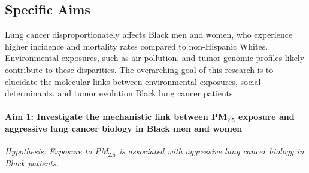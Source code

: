 \newcommand{\SpecificAimOne}{Investigate the mechanistic link between PM$_{2.5}$ exposure and aggressive lung cancer biology in Black men and women}
\newcommand{\SpecificAimOneA}{Determine the association between PM$_{2.5}$ exposure and TP53 somatic mutations in a cohort of 505 lung cancer patients}
\newcommand{\SpecificAimOneB}{Assess the relationship between adverse social determinants of health and PM$_{2.5}$ exposure}
\newcommand{\SpecificAimOneC}{Validate the association between PM$_{2.5}$ and aggressive lung cancer biology using an independent cohort}
\newcommand{\SpecificAimOneD}{Integrate PM$_{2.5}$ exposure data with tumor genomic profiles to identify specific mutational signatures associated with air pollution exposure}

\newcommand{\SpecificAimTwo}{Characterize the timing and order of somatic mutations during lung cancer evolution}
\newcommand{\SpecificAimTwoA}{Reconstruct tumor phylogenetic trees to infer the timing of driver mutations and copy number alterations}
\newcommand{\SpecificAimTwoB}{Identify common patterns in the order of genomic events across lung cancer subtypes}
\newcommand{\SpecificAimTwoC}{Determine whether the timing of mutations differs between Black and White patients}

\newcommand{\SpecificAimThree}{Map cell-cell signaling networks in the lung tumor microenvironment}
\newcommand{\SpecificAimThreeA}{Reconstruct ligand-receptor interactions between malignant, immune, stromal and endothelial cells using single-cell RNA sequencing}
\newcommand{\SpecificAimThreeB}{Identify key signaling pathways and cell-cell interactions associated with early lung cancer development}
\newcommand{\SpecificAimThreeC}{Determine how the tumor microenvironment signaling network differs between Black and White patients}

\subsection{Specific Aims}

Lung cancer disproportionately affects Black men and women, who experience higher incidence and mortality rates compared to non-Hispanic Whites. 
Environmental exposures, such as air pollution, and tumor genomic profiles likely contribute to these disparities. 
The overarching goal of this research is to elucidate the molecular links between environmental exposures, social determinants, 
and tumor evolution Black lung cancer patients.

\paragraph*{Aim 1: \SpecificAimOne} \emph{Hypothesis: Exposure to PM$_{2.5}$ is associated with aggressive lung cancer biology in Black patients.}

